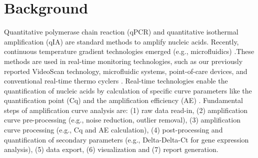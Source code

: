 \documentclass[twocolumn]{bmcart}%
\begin{document}
\section*{Background}

Quantitative polymerase chain reaction (qPCR) and quantitative isothermal 
amplification (qIA) are standard methods to amplify nucleic acids. Recently, 
continuous temperature gradient technologies emerged (e.g., microfluidics) 
\cite{rodiger_nucleic_2014}.These methods are used in real-time monitoring 
technologies, such as our previously reported VideoScan technology, microfluidic 
systems, point-of-care devices, and conventional real-time thermo cyclers 
\cite{rodiger_nucleic_2014,chang_2012,roediger_highly_2013}. Real-time 
technologies enable the quantification of nucleic acids by calculation of 
specific curve parameters like the quantification point (Cq) and the 
amplification efficiency (AE) \cite{ruijter_2013,pabinger_2014}. Fundamental 
steps of amplification curve analysis are: (1) raw data read-in, (2) 
amplification curve pre-processing (e.g., noise reduction, outlier removal), (3) 
amplification curve processing (e.g., Cq and AE calculation), (4) 
post-processing and quantification of secondary parameters (e.g., Delta-Delta-Ct 
for gene expression analysis), (5) data export, (6) visualization and (7) report 
generation.
\end{document}
